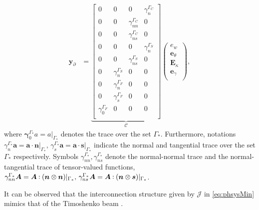 \begin{equation}
\begin{aligned}
\bm{y}_\partial &= \underbrace{
\begin{bmatrix}
{0} & {0} & {0} & \gamma_{n}^{\Gamma_C} \\
{0} & {0} & \gamma_{nn}^{\Gamma_C} & {0} \\
{0} & {0} & \gamma_{ns}^{\Gamma_C} & {0} \\
{0} & {0} & {0} & \gamma_{n}^{\Gamma_S} \\
{0} & {0} & \gamma_{ns}^{\Gamma_S} & {0} \\
{0} & \gamma_{n}^{\Gamma_S} & {0} & {0} \\
{0} & \gamma_{n}^{\Gamma_F} & {0} & {0} \\
{0} & \gamma_{s}^{\Gamma_F} & {0} & {0} \\
\gamma_{0}^{\Gamma_F} & {0} & {0} & {0} \\
\end{bmatrix}}_{\mathcal{C}}
\begin{pmatrix}
e_w \\
\bm{e}_{\theta} \\
\bm{E}_{\kappa} \\
\bm{e}_{\gamma} \\
\end{pmatrix},
\end{aligned}
\end{equation}
where $\bm\gamma_{0}^{\Gamma_*}a = a\vert_{\Gamma_*}$ denotes the trace over the set $\Gamma_*$. Furthermore, notations $\gamma_{n}^{\Gamma_*}\bm{a} = \bm{a} \cdot \bm{n}\vert_{\Gamma_*}, \,  \gamma_{s}^{\Gamma_*}\bm{a}= \bm{a} \cdot \bm{s}\vert_{\Gamma_*}$ indicate the normal and tangential trace over the set $\Gamma_*$ respectively. Symbols $\gamma_{nn}^{\Gamma_*}, \gamma_{ns}^{\Gamma_*}$ denote the normal-normal trace and the normal-tangential trace of tensor-valued functions, $\gamma_{nn}^{\Gamma_*}\bm{A} = \bm{A} \cddot (\bm{n} \otimes \bm{n})\vert_{\Gamma_*}, \, \gamma_{ns}^{\Gamma_*}\bm{A} = \bm{A} \cddot (\bm{n} \otimes \bm{s})\vert_{\Gamma_*}$.

\begin{remark}
	It can be observed that the interconnection structure given by $\mathcal{J}$ in \eqref{eq:phsysMin} mimics that of the Timoshenko beam \cite[Chapter 7]{zwart2012}.
\end{remark}

